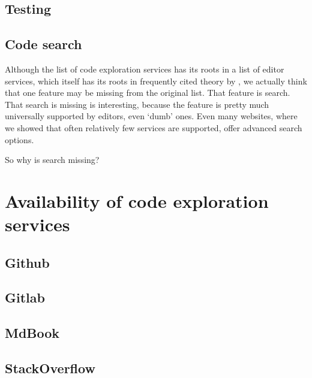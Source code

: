 \subsection*{Testing}


\subsection{Code search}\label{subsec:code-search}

Although the list of code exploration services has its roots in a list of editor services, which itself has its roots in
frequently cited theory by \citeauthor{ErdwegSV13}, we actually think that one feature may be missing from the original list.
That feature is search.
That search is missing is interesting, because the feature is pretty much universally supported by editors, even `dumb' ones.
Even many websites, where we showed that often relatively few services are supported, offer advanced search options.

So why is search missing?


\section{Availability of code exploration services}\label{sec:availability-of-code-exploration-services}




\subsection{Github}



\subsection{Gitlab}
\subsection{MdBook}
\subsection{StackOverflow}
